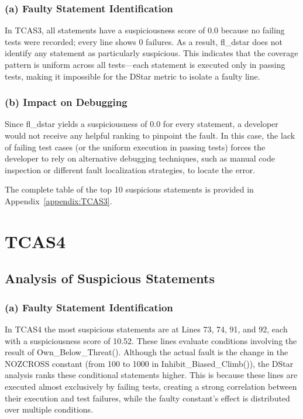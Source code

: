 \documentclass[conference]{IEEEtran}
\begin{document}
\subsubsection*{(a) Faulty Statement Identification}
In TCAS3, all statements have a suspiciousness score of 0.0 because no failing tests were recorded; every line shows 0 failures. As a result, fl\_dstar does not identify any statement as particularly suspicious. This indicates that the coverage pattern is uniform across all tests—each statement is executed only in passing tests, making it impossible for the DStar metric to isolate a faulty line.

\subsubsection*{(b) Impact on Debugging}
Since fl\_dstar yields a suspiciousness of 0.0 for every statement, a developer would not receive any helpful ranking to pinpoint the fault. In this case, the lack of failing test cases (or the uniform execution in passing tests) forces the developer to rely on alternative debugging techniques, such as manual code inspection or different fault localization strategies, to locate the error.

The complete table of the top 10 suspicious statements is provided in Appendix~\ref{appendix:TCAS3}.

\section{TCAS4}

\subsection{Analysis of Suspicious Statements}

\subsubsection*{(a) Faulty Statement Identification}
In TCAS4 the most suspicious statements are at Lines 73, 74, 91, and 92, each with a suspiciousness score of 10.52. These lines evaluate conditions involving the result of Own\_Below\_Threat(). Although the actual fault is the change in the NOZCROSS constant (from 100 to 1000 in Inhibit\_Biased\_Climb()), the DStar analysis ranks these conditional statements higher. This is because these lines are executed almost exclusively by failing tests, creating a strong correlation between their execution and test failures, while the faulty constant’s effect is distributed over multiple conditions.
\end{document}
